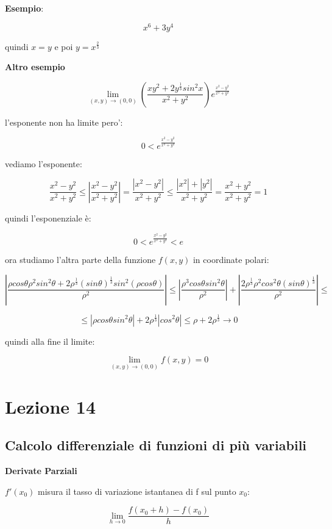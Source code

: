 \documentclass[11pt]{article}
\begin{document}
\textbf{Esempio}:

\[
    x^{6} + 3y^{4}
\]

quindi $x=y$ e poi $y = x^{ \frac{2}{3}}$

\textbf{Altro esempio} 

\[
\lim_{ (x,y) \to (0,0) } ( \frac{xy^{2}+2y^{ \frac{1}{3}}sin^{2}x}{x^{2}+y^{2}}) e ^{ \frac{x^{2}-y^{2}}{x^{2}+y^{2}}}
\]

l'esponente non ha limite pero':

\[
    0< e ^{ \frac{x^{2}-y^{2}}{x^{2}+y^{2}}} 
\]

vediamo l'esponente:

\[
    \frac{x^{2}-y^{2}}{x^{2}+y^{2}} \le |\frac{x^{2}-y^{2}}{x^{2}+y^{2}}| = \frac{|x^{2}-y^{2}|}{x^{2}+y^{2}}  \le \frac{|x^{2}|+|y^{2}|}{x^{2}+y^{2}} = \frac{x^{2}+y^{2}}{x^{2}+y^{2}} = 1
\]

quindi l'esponenziale è:

\[
    0< e ^{ \frac{x^{2}-y^{2}}{x^{2}+y^{2}}} < e
\]


ora studiamo l'altra parte della funzione $f(x,y)$ in coordinate polari:

\[
    | \frac{\rho cos \theta \rho^{2}sin^{2}\theta + 2 \rho^{ \frac{1}{3}}(sin \theta)^{ \frac{1}{3}}sin^{2}(\rho cos \theta)}{\rho^{2}}| \le  | \frac{\rho^{3}cos \theta sin^{2}\theta}{\rho^{2}}| + |\frac{2 \rho^{ \frac{1}{3}}\rho^{2}cos^{2}\theta (sin \theta)^{ \frac{1}{3}}}{\rho^{2}}| \le 
\]

\[
    \le | \rho cos \theta sin ^{2}\theta| + 2 \rho^{ \frac{1}{3}} | cos^{2}\theta| \le \rho + 2 \rho^{ \frac{1}{3}} \rightarrow 0
\]

quindi alla fine il limite:

\[
    \lim_{ (x,y) \to (0,0) } f(x,y)=0
\]

\section{Lezione 14}

\subsection{Calcolo differenziale di funzioni di più variabili}

\textbf{Derivate Parziali}

$f'(x_0)$ misura il tasso di variazione istantanea di f sul punto $x_0$:

\[
    \lim_{ h \to 0 } \frac{f(x_0+h)-f(x_0)}{h}
\]
\end{document}
